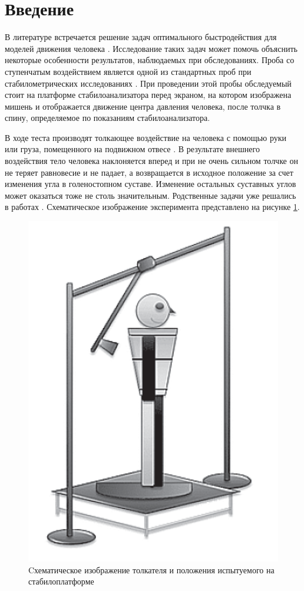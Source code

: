 \documentclass[a4paper,14pt]{article}
\theoremstyle{plain} %
\theoremstyle{definition} %
\theoremstyle{remark} %
\begin{document}
\thispagestyle{empty} %
\normalsize{
\newpage
\tableofcontents
\newpage

\section{Введение}
В литературе встречается решение задач оптимального быстродействия для моделей движения человека \cite{pandy,humanMovements}. Исследование таких задач может помочь объяснить некоторые особенности результатов, наблюдаемых при обследованиях.
Проба со ступенчатым воздействием является одной из стандартных проб
при стабилометрических исследованиях \cite{AdaptFizkult,stabilographTest}. При проведении этой пробы
обследуемый стоит на платформе стабилоанализатора перед экраном, на
котором изображена мишень и отображается движение центра давления
человека, после толчка в спину, определяемое по показаниям стабилоанализатора.

В ходе теста производят толкающее воздействие на человека с помощью руки или
груза, помещенного на подвижном отвесе \cite{pusher}. В результате внешнего
воздействия тело человека наклоняется вперед и при не очень сильном толчке
он не теряет равновесие и не падает, а возвращается в исходное
положение за счет изменения угла в голеностопном суставе. Изменение
остальных суставных углов может оказаться тоже не столь значительным.
Родственные задачи уже решались в работах \cite{PAKrychinin,kasatkin}.
Схематическое изображение эксперимента представлено на рисунке \ref{fig:pusher}.
\begin{figure}[h!]
    \centering
    \includegraphics[]{human.png}
    \caption{Cхематическое изображение толкателя и
        положения испытуемого на стабилоплатформе}
    \label{fig:pusher}
\end{figure}

}
\end{document}
